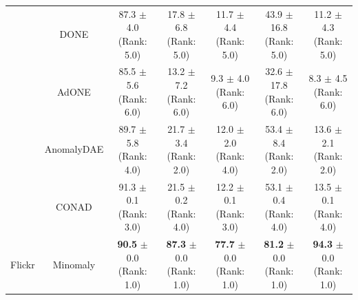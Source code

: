 \begin{table}[H]
\begin{tabular}{|l|c|c|c|c|c|c|}
    & DONE & \makecell{87.3 $\pm$ 4.0 \\[1pt] \tiny (Rank: 5.0)} & \makecell{17.8 $\pm$ 6.8 \\[1pt] \tiny (Rank: 5.0)} & \makecell{11.7 $\pm$ 4.4 \\[1pt] \tiny (Rank: 5.0)} & \makecell{43.9 $\pm$ 16.8 \\[1pt] \tiny (Rank: 5.0)} & \makecell{11.2 $\pm$ 4.3 \\[1pt] \tiny (Rank: 5.0)} \\
    & AdONE & \makecell{85.5 $\pm$ 5.6 \\[1pt] \tiny (Rank: 6.0)} & \makecell{13.2 $\pm$ 7.2 \\[1pt] \tiny (Rank: 6.0)} & \makecell{9.3 $\pm$ 4.0 \\[1pt] \tiny (Rank: 6.0)} & \makecell{32.6 $\pm$ 17.8 \\[1pt] \tiny (Rank: 6.0)} & \makecell{8.3 $\pm$ 4.5 \\[1pt] \tiny (Rank: 6.0)} \\
    & AnomalyDAE & \makecell{89.7 $\pm$ 5.8 \\[1pt] \tiny (Rank: 4.0)} & \makecell{21.7 $\pm$ 3.4 \\[1pt] \tiny (Rank: 2.0)} & \makecell{12.0 $\pm$ 2.0 \\[1pt] \tiny (Rank: 4.0)} & \makecell{53.4 $\pm$ 8.4 \\[1pt] \tiny (Rank: 2.0)} & \makecell{13.6 $\pm$ 2.1 \\[1pt] \tiny (Rank: 2.0)} \\
    & CONAD & \makecell{91.3 $\pm$ 0.1 \\[1pt] \tiny (Rank: 3.0)} & \makecell{21.5 $\pm$ 0.2 \\[1pt] \tiny (Rank: 4.0)} & \makecell{12.2 $\pm$ 0.1 \\[1pt] \tiny (Rank: 3.0)} & \makecell{53.1 $\pm$ 0.4 \\[1pt] \tiny (Rank: 4.0)} & \makecell{13.5 $\pm$ 0.1 \\[1pt] \tiny (Rank: 4.0)} \\ \hline
    \multirow{3}{*}{Flickr}
    & Minomaly & \makecell{\textbf{90.5} $\pm$ 0.0 \\[1pt] \tiny (Rank: 1.0)} & \makecell{\textbf{87.3} $\pm$ 0.0 \\[1pt] \tiny (Rank: 1.0)} & \makecell{\textbf{77.7} $\pm$ 0.0 \\[1pt] \tiny (Rank: 1.0)} & \makecell{\textbf{81.2} $\pm$ 0.0 \\[1pt] \tiny (Rank: 1.0)} & \makecell{\textbf{94.3} $\pm$ 0.0 \\[1pt] \tiny (Rank: 1.0)} \\

\end{tabular}
\end{table}
